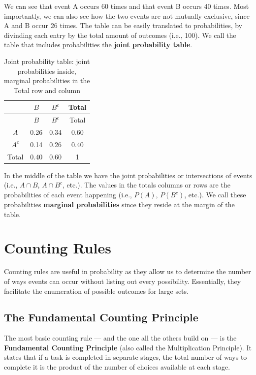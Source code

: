 \documentclass[
  11pt,
  letterpaper,
  DIV=11,
  numbers=noendperiod,
  oneside,
  open=any]{scrreprt}
\begin{document}
We can see that event A occurs 60 times and that event B occurs 40
times. Most importantly, we can also see how the two events are not
mutually exclusive, since A and B occur 26 times. The table can be
easily translated to probabilities, by divinding each entry by the total
amount of outcomes (i.e., 100). We call the table that includes
probabilities the \textbf{joint probability table}.

\begin{longtable}[]{@{}cccc@{}}
\caption{Joint probability table: joint probabilities inside, marginal
probabilities in the Total row and column}\tabularnewline
\toprule\noalign{}
& \(B\) & \(B^c\) & Total \\
\midrule\noalign{}
\endfirsthead
\toprule\noalign{}
& \(B\) & \(B^c\) & Total \\
\midrule\noalign{}
\endhead
\bottomrule\noalign{}
\endlastfoot
\(A\) & 0.26 & 0.34 & 0.60 \\
\(A^c\) & 0.14 & 0.26 & 0.40 \\
Total & 0.40 & 0.60 & 1 \\
\end{longtable}

In the middle of the table we have the joint probabilities or
intersections of events (i.e., \(A \cap B\), \(A \cap B^c\), etc.). The
values in the totals columns or rows are the probabilities of each event
happening (i.e., \(P(A)\), \(P(B^c)\), etc.). We call these
probabilities \textbf{marginal probabilities} since they reside at the
margin of the table.

\section{Counting Rules}\label{counting-rules}

Counting rules are useful in probability as they allow us to determine
the number of ways events can occur without listing out every
possibility. Essentially, they facilitate the enumeration of possible
outcomes for large sets.

\subsection*{The Fundamental Counting
Principle}\label{the-fundamental-counting-principle}

The most basic counting rule --- and the one all the others build on ---
is the \textbf{Fundamental Counting Principle} (also called the
Multiplication Principle). It states that if a task is completed in
separate stages, the total number of ways to complete it is the product
of the number of choices available at each stage.
\end{document}
